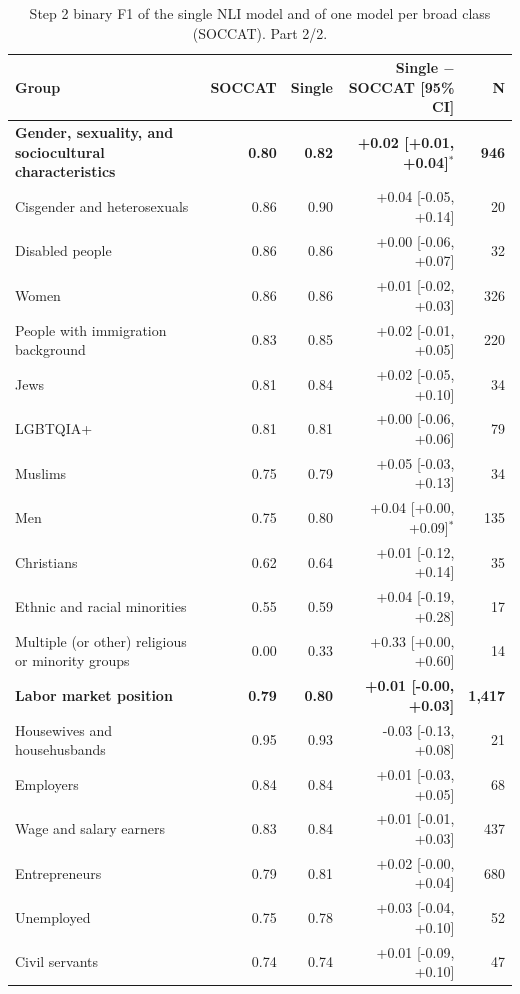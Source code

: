 \begin{table}[htbp]
\centering
\scriptsize
\begin{threeparttable}
\caption{Step 2 binary F1 of the single NLI model and of one model per broad class (SOCCAT). Part 2/2.}
\label{tab:single_nli_vs_main_part2}
\begin{tabular}{l rr r r}
\toprule
Group & SOCCAT & Single & Single $-$ SOCCAT [95\% CI] & N \\
\midrule
\textbf{Gender, sexuality, and sociocultural characteristics} & \textbf{0.80} & \textbf{0.82} & \textbf{+0.02 [+0.01, +0.04]$^{*}$} & \textbf{946} \\
\quad Cisgender and heterosexuals & 0.86 & 0.90 & +0.04 [-0.05, +0.14] & 20 \\
\quad Disabled people & 0.86 & 0.86 & +0.00 [-0.06, +0.07] & 32 \\
\quad Women & 0.86 & 0.86 & +0.01 [-0.02, +0.03] & 326 \\
\quad People with immigration background & 0.83 & 0.85 & +0.02 [-0.01, +0.05] & 220 \\
\quad Jews & 0.81 & 0.84 & +0.02 [-0.05, +0.10] & 34 \\
\quad LGBTQIA+ & 0.81 & 0.81 & +0.00 [-0.06, +0.06] & 79 \\
\quad Muslims & 0.75 & 0.79 & +0.05 [-0.03, +0.13] & 34 \\
\quad Men & 0.75 & 0.80 & +0.04 [+0.00, +0.09]$^{*}$ & 135 \\
\quad Christians & 0.62 & 0.64 & +0.01 [-0.12, +0.14] & 35 \\
\quad Ethnic and racial minorities & 0.55 & 0.59 & +0.04 [-0.19, +0.28] & 17 \\
\quad Multiple (or other) religious or minority groups & 0.00 & 0.33 & +0.33 [+0.00, +0.60] & 14 \\
\addlinespace
\textbf{Labor market position} & \textbf{0.79} & \textbf{0.80} & \textbf{+0.01 [-0.00, +0.03]} & \textbf{1,417} \\
\quad Housewives and househusbands & 0.95 & 0.93 & -0.03 [-0.13, +0.08] & 21 \\
\quad Employers & 0.84 & 0.84 & +0.01 [-0.03, +0.05] & 68 \\
\quad Wage and salary earners & 0.83 & 0.84 & +0.01 [-0.01, +0.03] & 437 \\
\quad Entrepreneurs & 0.79 & 0.81 & +0.02 [-0.00, +0.04] & 680 \\
\quad Unemployed & 0.75 & 0.78 & +0.03 [-0.04, +0.10] & 52 \\
\quad Civil servants & 0.74 & 0.74 & +0.01 [-0.09, +0.10] & 47 \\

\end{tabular}
\end{threeparttable}
\end{table}
